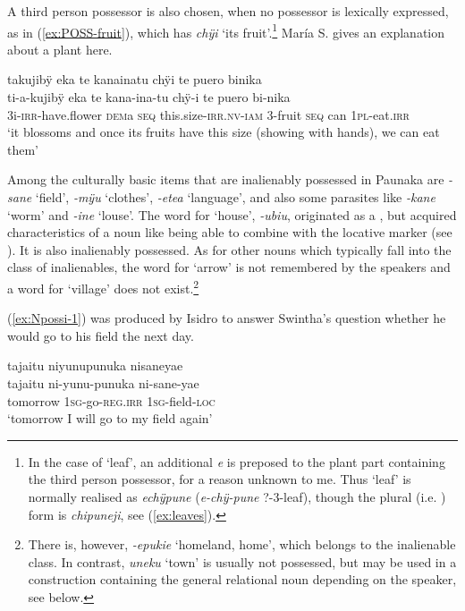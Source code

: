 A third person possessor is also chosen, when no possessor is lexically expressed, as in (\ref{ex:POSS-fruit}), which has \textit{chÿi} ‘its fruit’.\footnote{In the case of ‘leaf’, an additional \textit{e} is preposed to the plant part containing the third person possessor, for a reason unknown to me. Thus ‘leaf’ is normally realised as \textit{echÿpune} (\textit{e-chÿ-pune} ?-3-leaf), though the plural (i.e. ) form is \textit{chipuneji}, see (\ref{ex:leaves}).} María S. gives an explanation about a plant here.

\ea\label{ex:POSS-fruit}
\begingl 
\glpreamble takujibÿ eka te kanainatu chÿi te puero binika\\
\gla ti-a-kujibÿ eka te kana-ina-tu chÿ-i te puero bi-nika\\ 
\glb 3i-\textsc{irr}-have.flower \textsc{dem}a \textsc{seq} this.size-\textsc{irr.nv}-\textsc{iam} 3-fruit \textsc{seq} can 1\textsc{pl}-eat.\textsc{irr}\\ 
\glft ‘it blossoms and once its fruits have this size (showing with hands), we can eat them’\\ 
\endgl
\trailingcitation{[rxx-e121126s-3.16]}
\xe
{}


Among the culturally basic items that are inalienably possessed in Paunaka are \textit{-sane} ‘field’, \textit{-mÿu} ‘clothes’, \textit{-etea} ‘language’, and also some parasites like \textit{-kane} ‘worm’ and \textit{-ine} ‘louse’. The word for ‘house’, \textit{-ubiu}, originated as a , but acquired characteristics of a noun like being able to combine with the locative marker (see ). It is also inalienably possessed. As for other nouns which typically fall into the class of inalienables, the word for ‘arrow’ is not remembered by the speakers and a word for ‘village’ does not exist.\footnote{There is, however, \textit{-epukie} ‘homeland, home’, which belongs to the inalienable class. In contrast, \textit{uneku} ‘town’ is usually not possessed, but may be used in a construction containing the general relational noun depending on the speaker, see  below.}

(\ref{ex:Npossi-1}) was produced by Isidro to answer Swintha’s question whether he would go to his field the next day.

\ea\label{ex:Npossi-1}
\begingl
\glpreamble tajaitu niyunupunuka nisaneyae\\
\gla tajaitu ni-yunu-punuka ni-sane-yae\\
\glb tomorrow 1\textsc{sg}-go-\textsc{reg.irr} 1\textsc{sg}-field-\textsc{loc}\\
\glft ‘tomorrow I will go to my field again’
\endgl
\trailingcitation{[dxx-d120416s.129]}
\xe

